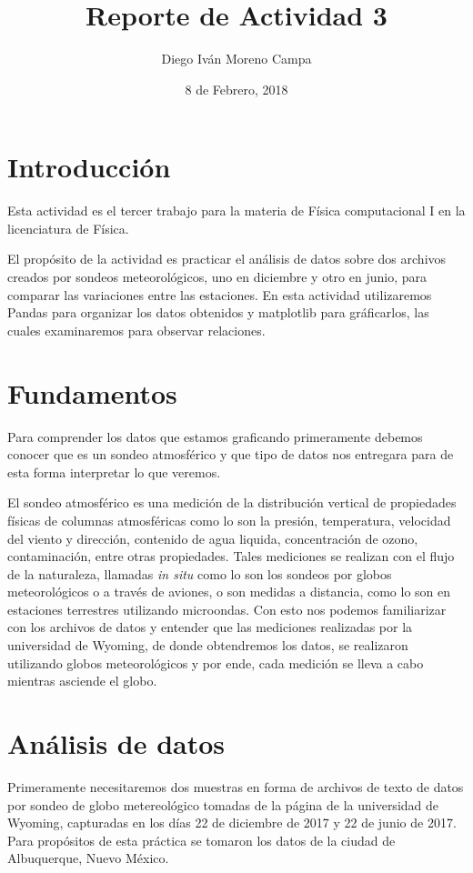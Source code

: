 \documentclass{article}
\title{Reporte de Actividad 3}
\author{Diego Iván Moreno Campa}
\date{8 de Febrero, 2018}
\begin{document}
\maketitle

\bigskip

\section{Introducción}

Esta actividad es el tercer trabajo para la materia de Física computacional I en la licenciatura de Física.

El propósito de la actividad es practicar el análisis de datos sobre dos archivos creados por sondeos meteorológicos, uno en diciembre y otro en junio, para comparar las variaciones entre las estaciones. En esta actividad utilizaremos Pandas para organizar los datos obtenidos y matplotlib para gráficarlos, las cuales examinaremos para observar relaciones.

\section{Fundamentos}

Para comprender los datos que estamos graficando primeramente debemos conocer que es un sondeo atmosférico y que tipo de datos nos entregara para de esta forma interpretar lo que veremos.

El sondeo atmosférico es una medición de la distribución vertical de propiedades físicas de columnas atmosféricas como lo son la presión, temperatura, velocidad del viento y dirección, contenido de agua liquida, concentración de ozono, contaminación, entre otras propiedades. Tales mediciones se realizan con el flujo de la naturaleza, llamadas \textit{in situ} como lo son los sondeos por globos meteorológicos o a través de aviones, o son medidas a distancia, como lo son en estaciones terrestres utilizando microondas.
Con esto nos podemos familiarizar con los archivos de datos y entender que las mediciones realizadas por la universidad de Wyoming, de donde obtendremos los datos, se realizaron utilizando globos meteorológicos y por ende, cada medición se lleva a cabo mientras asciende el globo.

\section{Análisis de datos}

Primeramente necesitaremos dos muestras en forma de archivos de texto de datos por sondeo de globo metereológico tomadas de la página de la universidad de Wyoming, capturadas en los días 22 de diciembre de 2017 y 22 de junio de 2017. Para propósitos de esta práctica se tomaron los datos de la ciudad de Albuquerque, Nuevo México.
\end{document}

